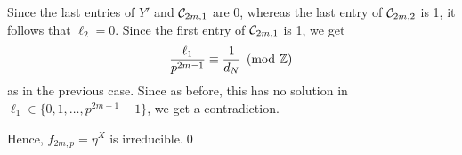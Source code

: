 \documentclass[a4paper,11pt]{amsart}
\begin{document}
Since the last entries of $Y'$ and $\mathcal{C}_{2m,1}$ are 0, whereas the last entry of $\mathcal{C}_{2m,2}$ is 1, it follows that $\ell_2=0$. Since the first entry 
of $\mathcal{C}_{2m, 1}$ is 1, we get $$\frac{\ell_1}{p^{2m-1}}\equiv\frac1{d_N}\pmod{\mathbb{Z}}$$
as in the previous case. %
Since as before, this has no solution in $\ell_1\in\{0,1,\hdots,p^{2m-1}-1\}$, we get a contradiction.

\vspace{2pt}
 Hence,
$f_{2m,p}=\eta^X$ is irreducible.\qed

% 
% 
% 
% 
% 
% 
% 
\end{document}
